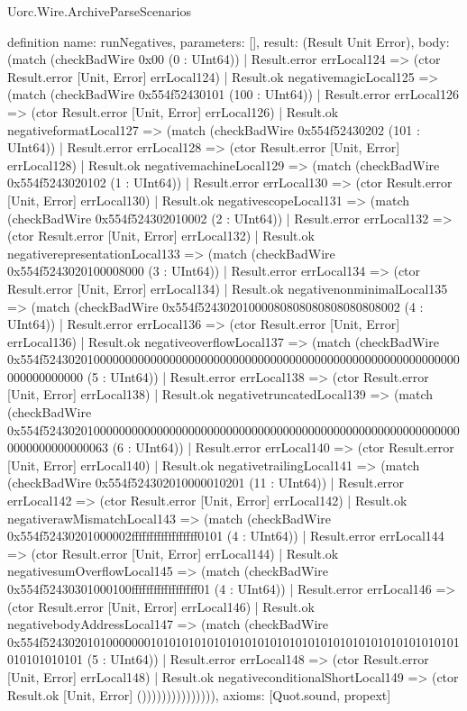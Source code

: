 \begin{lexlean}{Uorc.Wire.ArchiveParseScenarios}
\begin{semanticmodule}
definition{
  name: runNegatives,
  parameters: [],
  result: (Result Unit Error),
  body: (match (checkBadWire 0x00 (0 : UInt64))
    | Result.error errLocal124 => (ctor Result.error [Unit, Error] errLocal124)
    | Result.ok negativemagicLocal125 => (match (checkBadWire 0x554f52430101 (100 : UInt64))
      | Result.error errLocal126 => (ctor Result.error [Unit, Error] errLocal126)
      | Result.ok negativeformatLocal127 => (match (checkBadWire 0x554f52430202 (101 : UInt64))
        | Result.error errLocal128 => (ctor Result.error [Unit, Error] errLocal128)
        | Result.ok negativemachineLocal129 => (match (checkBadWire 0x554f5243020102 (1 : UInt64))
          | Result.error errLocal130 => (ctor Result.error [Unit, Error] errLocal130)
          | Result.ok negativescopeLocal131 => (match (checkBadWire 0x554f524302010002 (2 : UInt64))
            | Result.error errLocal132 => (ctor Result.error [Unit, Error] errLocal132)
            | Result.ok negativerepresentationLocal133 => (match (checkBadWire 0x554f5243020100008000 (3 : UInt64))
              | Result.error errLocal134 => (ctor Result.error [Unit, Error] errLocal134)
              | Result.ok negativenonminimalLocal135 => (match (checkBadWire 0x554f52430201000080808080808080808002 (4 : UInt64))
                | Result.error errLocal136 => (ctor Result.error [Unit, Error] errLocal136)
                | Result.ok negativeoverflowLocal137 => (match (checkBadWire 0x554f524302010000000000000000000000000000000000000000000000000000000000000000000000 (5 : UInt64))
                  | Result.error errLocal138 => (ctor Result.error [Unit, Error] errLocal138)
                  | Result.ok negativetruncatedLocal139 => (match (checkBadWire 0x554f5243020100000000000000000000000000000000000000000000000000000000000000000000000063 (6 : UInt64))
                    | Result.error errLocal140 => (ctor Result.error [Unit, Error] errLocal140)
                    | Result.ok negativetrailingLocal141 => (match (checkBadWire 0x554f524302010000010201 (11 : UInt64))
                      | Result.error errLocal142 => (ctor Result.error [Unit, Error] errLocal142)
                      | Result.ok negativerawMismatchLocal143 => (match (checkBadWire 0x554f52430201000002ffffffffffffffffff0101 (4 : UInt64))
                        | Result.error errLocal144 => (ctor Result.error [Unit, Error] errLocal144)
                        | Result.ok negativesumOverflowLocal145 => (match (checkBadWire 0x554f52430301000100ffffffffffffffffff01 (4 : UInt64))
                          | Result.error errLocal146 => (ctor Result.error [Unit, Error] errLocal146)
                          | Result.ok negativebodyAddressLocal147 => (match (checkBadWire 0x554f524302010100000001010101010101010101010101010101010101010101010101010101010101 (5 : UInt64))
                            | Result.error errLocal148 => (ctor Result.error [Unit, Error] errLocal148)
                            | Result.ok negativeconditionalShortLocal149 => (ctor Result.ok [Unit, Error] ())))))))))))))),
  axioms: [Quot.sound, propext]
}


\end{semanticmodule}
\end{lexlean}
